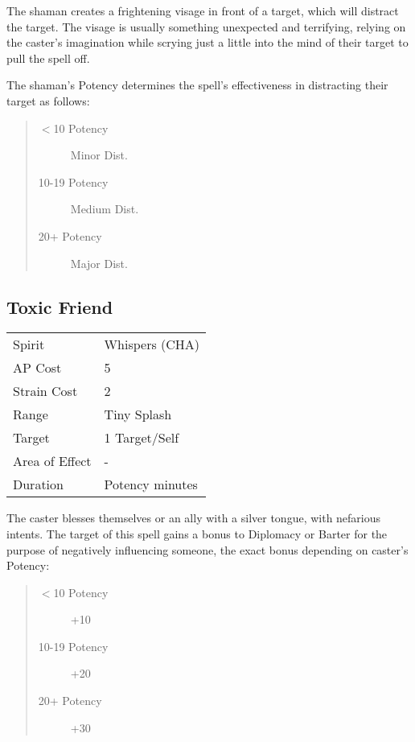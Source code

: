 \documentclass[11pt,a4paper,twocolumn]{book}
\begin{document}
The shaman creates a frightening visage in front of a target, which will distract the target.  The visage is usually something unexpected and terrifying, relying on the caster's imagination while scrying just a little into the mind of their target to pull the spell off.

The shaman's Potency determines the spell's effectiveness in distracting their target as follows:
\begin{quote}
	\begin{description}
		\item[$<$10 Potency] 	Minor Dist.
		\item[10-19 Potency] 	Medium Dist.
		\item[20+ Potency] 		Major Dist.
	\end{description}	
\end{quote}

\subsection*{Toxic Friend}
{
	\begin{tabu} to 70mm{| X[l,4] | X[l,7] |}
		\hline
		Spirit         & Whispers (CHA)  \\
		AP Cost        & 5               \\
		Strain Cost    & 2               \\
		Range          & Tiny Splash     \\
		Target         & 1 Target/Self   \\
		Area of Effect & -               \\
		Duration       & Potency minutes \\ \hline
	\end{tabu}
	
}
\medskip

The caster blesses themselves or an ally with a silver tongue, with nefarious intents. The target of this spell gains a bonus to Diplomacy or Barter for the purpose of negatively influencing someone, the exact bonus depending on caster's Potency:
\begin{quote}
	\begin{description}
		\item[$<$10 Potency] 	+10
		\item[10-19 Potency] 	+20
		\item[20+ Potency] 		+30
	\end{description}	
\end{quote}
\end{document}
